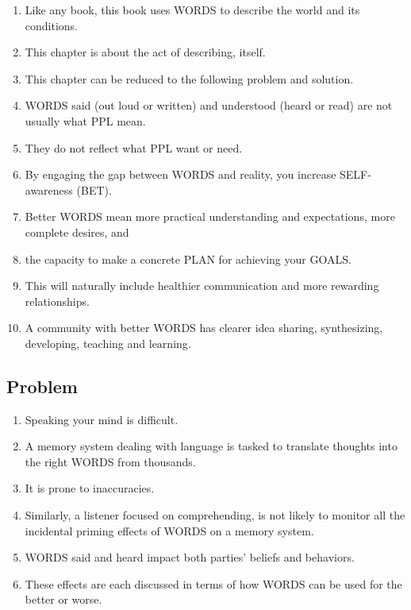\documentclass[
]{book}
\providecommand{\tightlist}{%
  \setlength{\itemsep}{0pt}\setlength{\parskip}{0pt}}
\begin{document}
\begin{enumerate}
\def\labelenumi{\arabic{enumi}.}
\tightlist
\item
  Like any book, this book uses WORDS to describe the world and its
  conditions.
\item
  This chapter is about the act of describing, itself.
\item
  This chapter can be reduced to the following problem and solution.
\item
  WORDS said (out loud or written) and understood (heard or read) are
  not usually what PPL mean.
\item
  They do not reflect what PPL want or need.
\item
  By engaging the gap between WORDS and reality, you increase SELF-
  awareness (BET).
\item
  Better WORDS mean more practical understanding and expectations,
  more complete desires, and
\item
  the capacity to make a concrete PLAN for achieving your GOALS.
\item
  This will naturally include healthier communication and more
  rewarding relationships.
\item
  A community with better WORDS has clearer idea sharing,
  synthesizing, developing, teaching and learning.
\end{enumerate}

\hypertarget{problem}{%
\subsection{Problem}\label{problem}}

\begin{enumerate}
\def\labelenumi{\arabic{enumi}.}
\setcounter{enumi}{10}
\tightlist
\item
  Speaking your mind is difficult.
\item
  A memory system dealing with language is tasked to translate
  thoughts into the right WORDS from thousands.
\item
  It is prone to inaccuracies.
\item
  Similarly, a listener focused on comprehending, is not likely to monitor
  all the incidental priming effects of WORDS on a memory system.
\item
  WORDS said and heard impact both parties' beliefs and behaviors.
\item
  These effects are each discussed in terms of how WORDS can be used
  for the better or worse.
\end{enumerate}
\end{document}
